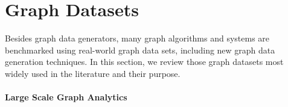 \section{Graph Datasets}
\label{sec:data_sets}

Besides graph data generators, many graph algorithms and systems are benchmarked
using real-world graph data sets, including new graph data generation
techniques. In this section, we review those graph datasets most widely used in
the literature and their purpose.


\paragraph{Large Scale Graph Analytics}

